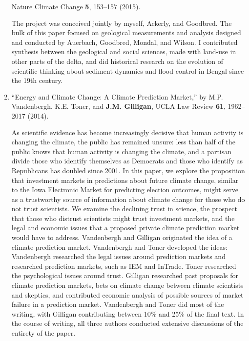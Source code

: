 \begin{enumerate}
	    Nature Climate Change
        \textbf{5}, 153--157 (2015).
        \begin{credit}
        The project was conceived jointly by myself, Ackerly, and Goodbred. The bulk of this paper focused on geological measurements and analysis designed and conducted by Auerbach, Goodbred, Mondal, and Wilson. I contributed synthesis between the geological and social sciences, made with land-use in other parts of the delta, and did historical research on the evolution of scientific thinking about sediment dynamics and flood control in Bengal since the 19th century.
        \end{credit}
%
    \item 
	\enquote{Energy and Climate Change: A Climate Prediction Market,}
	    by M.P. Vandenbergh, K.E. Toner, and \textbf{J.M. Gilligan}, 
	    UCLA Law Review 
        \textbf{61}, 1962--2017 (2014).
	  \begin{credit}
	As scientific evidence has become increasingly decisive that human activity is changing the climate, the public has remained unsure: less than half of the public knows that human activity is changing the climate, and a partisan divide those who identify themselves as Democrats and those who identify as Republicans has doubled since 2001. In this paper, we explore the proposition that investment markets in predictions about future climate change, similar to the Iowa Electronic Market for predicting election outcomes, might serve as a trustworthy source of information about climate change for those who do not trust scientists. We examine the declining trust in science, the prospect that those who distrust scientists might trust investment markets, and the legal and economic issues that a proposed private climate prediction market would have to address.  Vandenbergh and Gilligan originated the idea of a climate prediction market. Vandenbergh and Toner developed the ideas: Vandenbergh researched the legal issues around prediction markets and researched prediction markets, such as IEM and InTrade. Toner researched the psychological issues around trust. Gilligan researched past proposals for climate prediction markets, bets on climate change between climate scientists and skeptics, and contributed economic analysis of possible sources of market failure in a prediction market. Vandenbergh and Toner did most of the writing, with Gilligan contributing between 10\% and 25\% of the final text. In the course of writing, all three authors conducted extensive discussions of the entirety of the paper.
	  \end{credit}

\end{enumerate}
